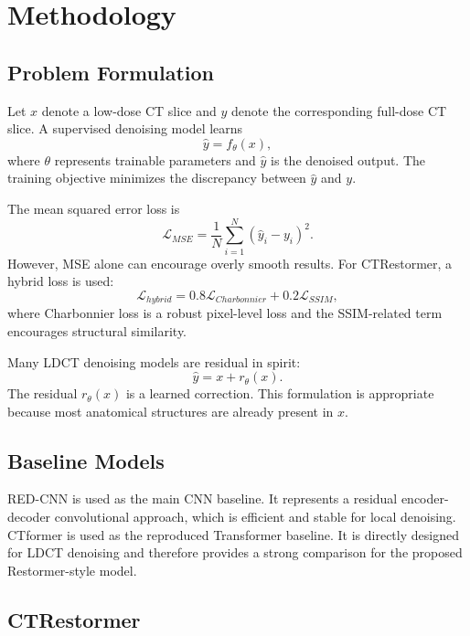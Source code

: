 \documentclass[12pt,a4paper]{report}
\begin{document}
\chapter{Methodology}

\section{Problem Formulation}

Let \(x\) denote a low-dose CT slice and \(y\) denote the corresponding full-dose CT slice. A supervised denoising model learns
\begin{equation}
\hat{y}=f_{\theta}(x),
\end{equation}
where \(\theta\) represents trainable parameters and \(\hat{y}\) is the denoised output. The training objective minimizes the discrepancy between \(\hat{y}\) and \(y\).

The mean squared error loss is
\begin{equation}
\mathcal{L}_{MSE}=\frac{1}{N}\sum_{i=1}^{N}(\hat{y}_i-y_i)^2.
\end{equation}
However, MSE alone can encourage overly smooth results. For CTRestormer, a hybrid loss is used:
\begin{equation}
\mathcal{L}_{hybrid}=0.8\mathcal{L}_{Charbonnier}+0.2\mathcal{L}_{SSIM},
\end{equation}
where Charbonnier loss is a robust pixel-level loss and the SSIM-related term encourages structural similarity.

Many LDCT denoising models are residual in spirit:
\begin{equation}
\hat{y}=x+r_{\theta}(x).
\end{equation}
The residual \(r_{\theta}(x)\) is a learned correction. This formulation is appropriate because most anatomical structures are already present in \(x\).

\section{Baseline Models}

RED-CNN is used as the main CNN baseline. It represents a residual encoder-decoder convolutional approach, which is efficient and stable for local denoising. CTformer is used as the reproduced Transformer baseline. It is directly designed for LDCT denoising and therefore provides a strong comparison for the proposed Restormer-style model.

\section{CTRestormer}
\end{document}

